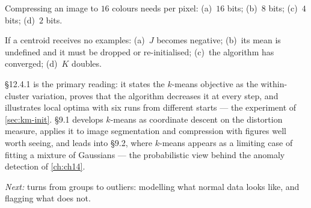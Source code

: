 \qz Compressing an image to $16$ colours needs per pixel: (a)~$16$ bits;
(b)~$8$ bits; (c)~$4$ bits; (d)~$2$ bits.

\qz If a centroid receives no examples: (a)~$J$ becomes negative; (b)~its mean is
undefined and it must be dropped or re-initialised; (c)~the algorithm has
converged; (d)~$K$ doubles.

\furtherreading

\textcite{james2021} §12.4.1 is the primary reading: it states the $k$-means
objective as the within-cluster variation, proves that the algorithm decreases it
at every step, and illustrates local optima with six runs from different starts
--- the experiment of \cref{sec:km-init}. \textcite{bishop2006} §9.1 develops
$k$-means as coordinate descent on the distortion measure, applies it to image
segmentation and compression with figures well worth seeing, and leads into §9.2,
where $k$-means appears as a limiting case of fitting a mixture of Gaussians ---
the probabilistic view behind the anomaly detection of \cref{ch:ch14}.

\bigskip
\noindent\emph{Next:}  turns from groups to outliers: modelling
what normal data looks like, and flagging what does not.
